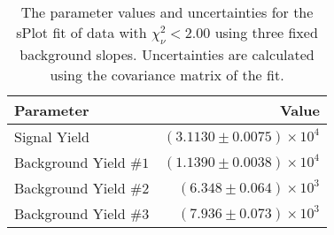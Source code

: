 
\begin{table}[ht]
    \begin{center}
        \begin{tabular}{lr}\toprule
            Parameter & Value \\\midrule
            Signal Yield & $(3.1130 \pm 0.0075) \times 10^{4}$ \\
            Background Yield $\#1$ & $(1.1390 \pm 0.0038) \times 10^{4}$ \\
            Background Yield $\#2$ & $(6.348 \pm 0.064) \times 10^{3}$ \\
            Background Yield $\#3$ & $(7.936 \pm 0.073) \times 10^{3}$ \\\bottomrule
        \end{tabular}
        \caption{The parameter values and uncertainties for the sPlot fit of data with $\chi^2_\nu < 2.00$ using three fixed background slopes. Uncertainties are calculated using the covariance matrix of the fit.}\label{tab:splot-fit-results-chisqdof-2.00-fixed-3}
    \end{center}
\end{table}
